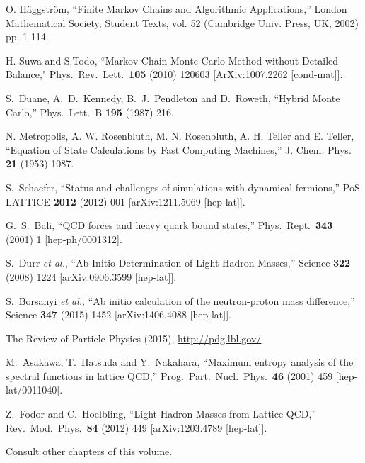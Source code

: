 \begin{thebibliography}{99.}
  O. H\"{a}ggstr\"{o}m,
  ``Finite Markov Chains and Algorithmic Applications,''
 London Mathematical Society, Student Texts, vol. 52   (Cambridge Univ. Press, UK, 2002) pp. 1-114.    

 H. Suwa and S.Todo,
 ``Markov Chain Monte Carlo Method without Detailed Balance,"
 Phys.\ Rev.\ Lett.\ {\bf 105} (2010) 120603
 [ArXiv:1007.2262 [cond-mat]].

  S.~Duane, A.~D.~Kennedy, B.~J.~Pendleton and D.~Roweth,
  ``Hybrid Monte Carlo,''
  Phys.\ Lett.\ B {\bf 195} (1987) 216.
  
 N. Metropolis, A. W. Rosenbluth, M. N. Rosenbluth, A. H. Teller and E. Teller,
 ``Equation of State Calculations by Fast Computing Machines,''
 J. Chem. Phys. {\bf 21} (1953) 1087.
  
  S.~Schaefer,
 ``Status and challenges of simulations with dynamical fermions,''
  PoS LATTICE {\bf 2012} (2012) 001
  [arXiv:1211.5069 [hep-lat]].  
  
  G.~S.~Bali,
  ``QCD forces and heavy quark bound states,''
  Phys.\ Rept.\  {\bf 343} (2001) 1
  [hep-ph/0001312]. 

  S.~Durr {\it et al.},
  ``Ab-Initio Determination of Light Hadron Masses,''
  Science {\bf 322} (2008) 1224
  [arXiv:0906.3599 [hep-lat]].
  
  S.~Borsanyi {\it et al.},
 ``Ab initio calculation of the neutron-proton mass difference,''
  Science {\bf 347} (2015) 1452
  [arXiv:1406.4088 [hep-lat]].  
  
The Review of Particle Physics (2015),
\url{http://pdg.lbl.gov/ } 
  
  M.~Asakawa, T.~Hatsuda and Y.~Nakahara,
 ``Maximum entropy analysis of the spectral functions in lattice QCD,''
  Prog.\ Part.\ Nucl.\ Phys.\  {\bf 46} (2001) 459
  [hep-lat/0011040].
  
  Z.~Fodor and C.~Hoelbling,
 ``Light Hadron Masses from Lattice QCD,''
  Rev.\ Mod.\ Phys.\  {\bf 84} (2012) 449
  [arXiv:1203.4789 [hep-lat]].
   
Consult other chapters of this volume.
 

\end{thebibliography}

